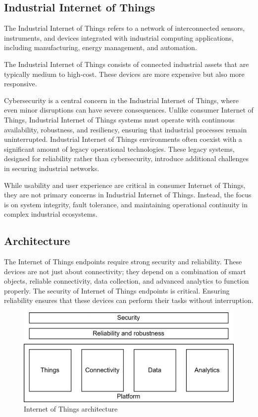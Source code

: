 \subsection{Industrial Internet of Things}
\begin{definition}
    The Industrial Internet of Things refers to a network of interconnected sensors, instruments, and devices integrated with industrial computing applications, including manufacturing, energy management, and automation.
\end{definition}
The Industrial Internet of Things consists of connected industrial assets that are typically medium to high-cost. 
These devices are more expensive but also more responsive.

Cybersecurity is a central concern in the Industrial Internet of Things, where even minor disruptions can have severe consequences. 
Unlike consumer Internet of Things, Industrial Internet of Things systems must operate with continuous availability, robustness, and resiliency, ensuring that industrial processes remain uninterrupted.
Industrial Internet of Things environments often coexist with a significant amount of legacy operational technologies. 
These legacy systems, designed for reliability rather than cybersecurity, introduce additional challenges in securing industrial networks.

While usability and user experience are critical in consumer Internet of Things, they are not primary concerns in Industrial Internet of Things. 
Instead, the focus is on system integrity, fault tolerance, and maintaining operational continuity in complex industrial ecosystems.

\subsection{Architecture}
The Internet of Things endpoints require strong security and reliability. 
These devices are not just about connectivity; they depend on a combination of smart objects, reliable connectivity, data collection, and advanced analytics to function properly.
The security of Internet of Things endpoints is critical. 
Ensuring reliability ensures that these devices can perform their tasks without interruption.
\begin{figure}[H]
    \centering
    \includegraphics[width=0.75\linewidth]{images/iot1.png}
    \caption{Internet of Things architecture}
\end{figure}